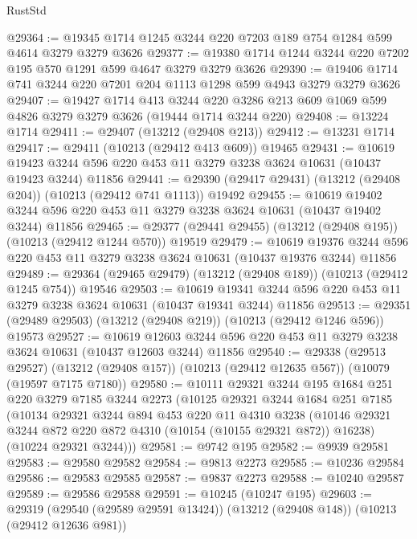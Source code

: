 \begin{lexlean}{RustStd}
\begin{coremodule}
{\begin{coremodule}
{{{{{{{{{{{{{{{{{{{{{{{{{{@29364 := @19345 @1714 @1245 @3244 @220 @7203 @189 @754 @1284 @599 @4614 @3279 @3279 @3626
@29377 := @19380 @1714 @1244 @3244 @220 @7202 @195 @570 @1291 @599 @4647 @3279 @3279 @3626
@29390 := @19406 @1714 @741 @3244 @220 @7201 @204 @1113 @1298 @599 @4943 @3279 @3279 @3626
@29407 := @19427
    @1714
    @413
    @3244
    @220
    @3286
    @213
    @609
    @1069
    @599
    @4826
    @3279
    @3279
    @3626
    (@19444 @1714 @3244 @220)
@29408 := @13224 @1714
@29411 := @29407 (@13212 (@29408 @213))
@29412 := @13231 @1714
@29417 := @29411 (@10213 (@29412 @413 @609)) @19465
@29431 := @10619
    @19423
    @3244
    @596
    @220
    @453
    @11
    @3279
    @3238
    @3624
    @10631
    (@10437 @19423 @3244)
    @11856
@29441 := @29390 (@29417 @29431) (@13212 (@29408 @204)) (@10213 (@29412 @741 @1113)) @19492
@29455 := @10619
    @19402
    @3244
    @596
    @220
    @453
    @11
    @3279
    @3238
    @3624
    @10631
    (@10437 @19402 @3244)
    @11856
@29465 := @29377 (@29441 @29455) (@13212 (@29408 @195)) (@10213 (@29412 @1244 @570)) @19519
@29479 := @10619
    @19376
    @3244
    @596
    @220
    @453
    @11
    @3279
    @3238
    @3624
    @10631
    (@10437 @19376 @3244)
    @11856
@29489 := @29364 (@29465 @29479) (@13212 (@29408 @189)) (@10213 (@29412 @1245 @754)) @19546
@29503 := @10619
    @19341
    @3244
    @596
    @220
    @453
    @11
    @3279
    @3238
    @3624
    @10631
    (@10437 @19341 @3244)
    @11856
@29513 := @29351 (@29489 @29503) (@13212 (@29408 @219)) (@10213 (@29412 @1246 @596)) @19573
@29527 := @10619
    @12603
    @3244
    @596
    @220
    @453
    @11
    @3279
    @3238
    @3624
    @10631
    (@10437 @12603 @3244)
    @11856
@29540 := @29338
    (@29513 @29527)
    (@13212 (@29408 @157))
    (@10213 (@29412 @12635 @567))
    (@10079 (@19597 @7175 @7180))
@29580 := @10111
    @29321
    @3244
    @195
    @1684
    @251
    @220
    @3279
    @7185
    @3244
    @2273
    (@10125
      @29321
      @3244
      @1684
      @251
      @7185
      (@10134
        @29321
        @3244
        @894
        @453
        @220
        @11
        @4310
        @3238
        (@10146 @29321 @3244 @872 @220 @872 @4310 (@10154 (@10155 @29321 @872)) @16238)
        (@10224 @29321 @3244)))
@29581 := @9742 @195
@29582 := @9939 @29581
@29583 := @29580 @29582
@29584 := @9813 @2273
@29585 := @10236 @29584
@29586 := @29583 @29585
@29587 := @9837 @2273
@29588 := @10240 @29587
@29589 := @29586 @29588
@29591 := @10245 (@10247 @195)
@29603 := @29319
    (@29540 (@29589 @29591 @13424))
    (@13212 (@29408 @148))
    (@10213 (@29412 @12636 @981))
}}}}}}}}}}}}}}}}}}}}}}}}}}
\end{coremodule}}
\end{coremodule}
\end{lexlean}
